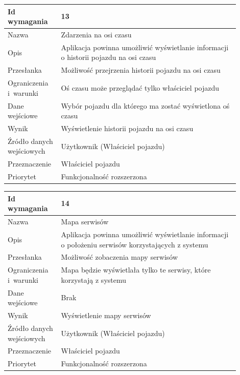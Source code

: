 \documentclass[12pt]{article}
\begin{document}
\begin{table}[H]
\begin{center}
	\begin{tabular}{|p{0.18\linewidth}|p{0.72\linewidth}|}%
	\hline
	Id wymagania 	& 13 				\\ \hline
	Nazwa			& Zdarzenia na osi czasu \\ \hline
	Opis &Aplikacja powinna umożliwić wyświetlanie informacji o historii pojazdu na osi czasu
\\ \hline
	Przesłanka & Możliwość przejrzenia historii pojazdu na osi czasu \\ \hline
	Ograniczenia i~warunki & Oś czasu może przeglądać tylko właściciel pojazdu \\ \hline
	Dane wejściowe & Wybór pojazdu dla którego ma zostać wyświetlona oś czasu \\ \hline
	Wynik &Wyświetlenie historii pojazdu na osi czasu\\ \hline
	Źródło danych wejściowych &Użytkownik (Właściciel pojazdu)\\ \hline
	Przeznaczenie & Właściciel pojazdu\\ \hline
	Priorytet & Funkcjonalność rozszerzona \\ \hline
	\end{tabular}
\end{center}
\end{table}
\begin{table}[H]
\begin{center}
	\begin{tabular}{|p{0.18\linewidth}|p{0.72\linewidth}|}%
	\hline
	Id wymagania 	& 14				\\ \hline
	Nazwa			& Mapa serwisów \\ \hline
	Opis &Aplikacja powinna umożliwić wyświetlanie informacji o położeniu serwisów korzystających z systemu
\\ \hline
	Przesłanka & Możliwość zobaczenia mapy serwisów \\ \hline
	Ograniczenia i~warunki & Mapa będzie wyświetlała tylko te serwisy, które korzystają z systemu\\ \hline
	Dane wejściowe & Brak \\ \hline
	Wynik &Wyświetlenie mapy serwisów\\ \hline
	Źródło danych wejściowych &Użytkownik (Właściciel pojazdu)\\ \hline
	Przeznaczenie & Właściciel pojazdu\\ \hline
	Priorytet & Funkcjonalność rozszerzona \\ \hline
	\end{tabular}
\end{center}
\end{table}
\newpage
\end{document}
